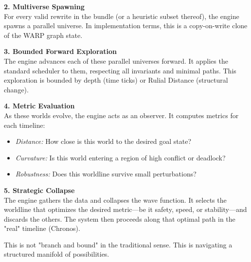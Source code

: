 \textbf{2. Multiverse Spawning} \\
For every valid rewrite in the bundle (or a heuristic subset thereof), the engine spawns a parallel universe. In implementation terms, this is a copy-on-write clone of the WARP graph state.

\textbf{3. Bounded Forward Exploration} \\
The engine advances each of these parallel universes forward. It applies the standard scheduler to them, respecting all invariants and minimal paths. This exploration is bounded by depth (time ticks) or Rulial Distance (structural change).

\textbf{4. Metric Evaluation} \\
As these worlds evolve, the engine acts as an observer. It computes metrics for each timeline: 
\begin{itemize}
    \item \textit{Distance:} How close is this world to the desired goal state?
    \item \textit{Curvature:} Is this world entering a region of high conflict or deadlock?
    \item \textit{Robustness:} Does this worldline survive small perturbations?
\end{itemize}

\textbf{5. Strategic Collapse} \\
The engine gathers the data and collapses the wave function. It selects the worldline that optimizes the desired metric—be it safety, speed, or stability—and discards the others. The system then proceeds along that optimal path in the "real" timeline (Chronos).

This is not "branch and bound" in the traditional sense. This is navigating a structured manifold of possibilities.

